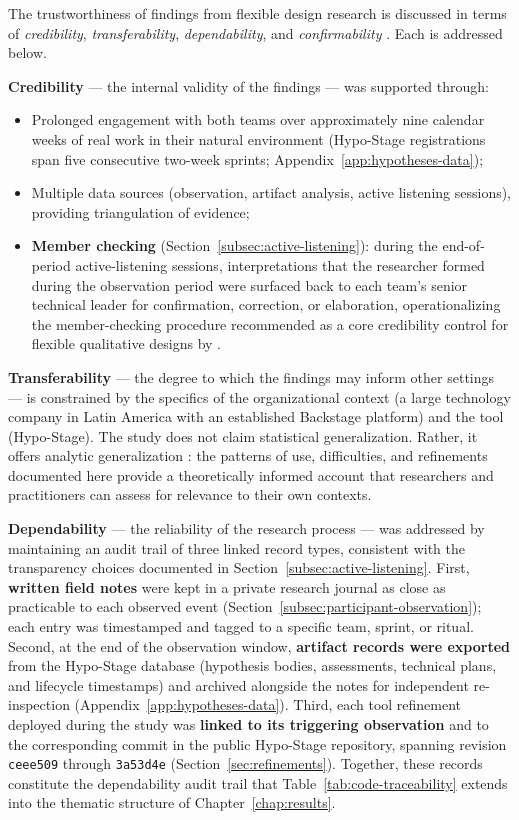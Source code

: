 The trustworthiness of findings from flexible design research is discussed in terms of \emph{credibility}, \emph{transferability},
\emph{dependability}, and \emph{confirmability} \citep{robson2016}. Each is addressed
below.

\textbf{Credibility} --- the internal validity of the findings --- was supported
through: 
\begin{itemize}
  \item[(i)] Prolonged engagement with both teams over approximately nine calendar weeks of real work in their natural environment (Hypo-Stage registrations span five consecutive two-week sprints; Appendix~\ref{app:hypotheses-data});
  \item[(ii)] Multiple data sources (observation, artifact analysis, active listening sessions), providing triangulation of evidence;
  \item[(iii)] \textbf{Member checking} (Section~\ref{subsec:active-listening}): during the end-of-period active-listening sessions, interpretations that the researcher formed during the observation period were surfaced back to each team's senior technical leader for confirmation, correction, or elaboration, operationalizing the member-checking procedure recommended as a core credibility control for flexible qualitative
    designs by \citet{robson2016}.
\end{itemize}

\textbf{Transferability} --- the degree to which the findings may inform other
settings --- is constrained by the specifics of the organizational context (a large
technology company in Latin America with an established Backstage platform) and the
tool (Hypo-Stage). The study does not claim statistical generalization. Rather, it
offers analytic generalization \citep{robson2016,yin2009}: the patterns of use,
difficulties, and refinements documented here provide a theoretically informed
account that researchers and practitioners can assess for relevance to their own
contexts.

\textbf{Dependability} --- the reliability of the research process --- was addressed
by maintaining an audit trail of three linked record types, consistent with the
transparency choices documented in Section~\ref{subsec:active-listening}.
First, \textbf{written field notes} were
kept in a private research journal as close as practicable to each observed event
(Section~\ref{subsec:participant-observation}); each entry was timestamped and
tagged to a specific team, sprint, or ritual. Second, at the end of the observation
window, \textbf{artifact records were exported} from the Hypo-Stage database
(hypothesis bodies, assessments, technical plans, and lifecycle timestamps) and
archived alongside the notes for independent re-inspection
(Appendix~\ref{app:hypotheses-data}). Third, each tool refinement deployed during
the study was \textbf{linked to its triggering observation} and to the corresponding
commit in the public Hypo-Stage repository, spanning revision \texttt{ceee509}
through \texttt{3a53d4e} (Section~\ref{sec:refinements}). Together, these records
constitute the dependability audit trail that Table~\ref{tab:code-traceability}
extends into the thematic structure of Chapter~\ref{chap:results}.

